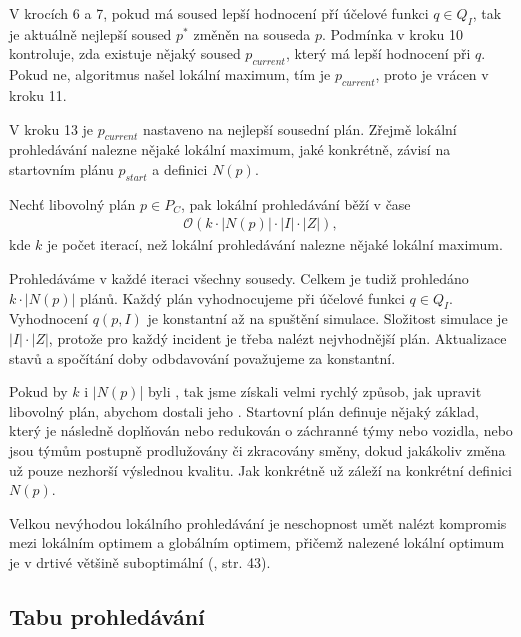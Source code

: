 V krocích 6 a 7, pokud má soused lepší hodnocení pří účelové funkci $q \in Q_I$, tak je aktuálně nejlepší soused $p^*$ změněn na souseda $p$.
Podmínka v kroku 10 kontroluje, zda existuje nějaký soused $p_{current}$, který má lepší hodnocení při $q$.
Pokud ne, algoritmus našel lokální maximum, tím je $p_{current}$, proto je vrácen v kroku 11.

V kroku 13 je $p_{current}$ nastaveno na nejlepší sousední plán.
Zřejmě lokální prohledávání nalezne nějaké lokální maximum, jaké konkrétně, závisí na startovním plánu $p_{start}$ a definici $N(p)$.

\begin{veta}
  Nechť libovolný plán $p \in P_C$, pak lokální prohledávání běží v čase
  \begin{align*}
    \mathcal{O}(k \cdot |N(p)| \cdot |I| \cdot |Z|),
  \end{align*}
  kde $k$ je počet iterací, než lokální prohledávání nalezne nějaké lokální maximum.
\end{veta}
\begin{dukaz}
  Prohledáváme v každé iteraci všechny sousedy. Celkem je tudiž prohledáno $k \cdot |N(p)|$ plánů.
  Každý plán vyhodnocujeme při účelové funkci $q \in Q_I$. Vyhodnocení $q(p, I)$ je konstantní až na spuštění simulace. 
  Složitost simulace je $|I| \cdot |Z|$, protože pro každý incident je třeba nalézt nejvhodnější plán.
  Aktualizace stavů a spočítání doby odbdavování považujeme za konstantní.
\end{dukaz}

Pokud by $k$ i $|N(p)$| byli , tak jsme získali velmi rychlý způsob, jak upravit libovolný plán, abychom dostali jeho . 
Startovní plán definuje nějaký základ, který je následně doplňován nebo redukován o záchranné týmy nebo vozidla,
nebo jsou týmům postupně prodlužovány či zkracovány směny,
dokud jakákoliv změna už pouze nezhorší výslednou kvalitu. 
Jak konkrétně už záleží na konkrétní definici $N(p)$.

Velkou nevýhodou lokálního prohledávání je neschopnost umět nalézt kompromis mezi lokálním optimem a globálním optimem,
přičemž nalezené lokální optimum je v drtivé většině suboptimální (\citet{GlovKoch03}, str. 43).

\subsection{Tabu prohledávání}

